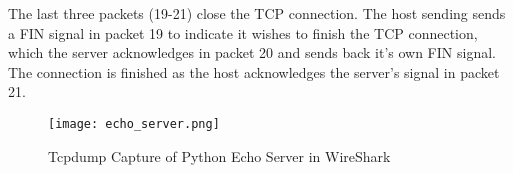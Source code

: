 The last three packets (19-21) close the TCP connection. The host sending sends a FIN signal in packet 19 to indicate it wishes to finish the TCP connection, which the server acknowledges in packet 20 and sends back it's own FIN signal. The connection is finished as the host acknowledges the server's signal in packet 21.

\begin{figure}[htp]
\centering
\caption[echo_wireshark]{Tcpdump Capture of Python Echo Server in WireShark}\label{fig:echo_wireshark}
\texttt{[image: echo\_server.png]}
\end{figure}